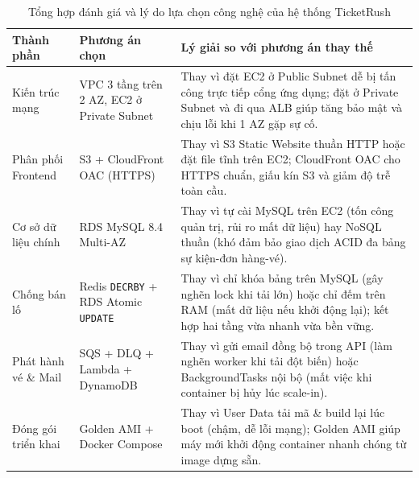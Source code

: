 \begin{table}[H]
  \centering
  \scriptsize
  \renewcommand{\arraystretch}{1.25}
  \begin{tabularx}{\textwidth}{>{\raggedright\arraybackslash}p{2.6cm} >{\raggedright\arraybackslash}p{3.1cm} >{\raggedright\arraybackslash}X}
    \toprule
    \textbf{Thành phần} & \textbf{Phương án chọn} & \textbf{Lý giải so với phương án thay thế} \\
    \midrule
    Kiến trúc mạng & VPC 3 tầng trên 2 AZ, EC2 ở Private Subnet & Thay vì đặt EC2 ở Public Subnet dễ bị tấn công trực tiếp cổng ứng dụng; đặt ở Private Subnet và đi qua ALB giúp tăng bảo mật và chịu lỗi khi 1 AZ gặp sự cố. \\
    \midrule
    Phân phối Frontend & S3 + CloudFront OAC (HTTPS) & Thay vì S3 Static Website thuần HTTP hoặc đặt file tĩnh trên EC2; CloudFront OAC cho HTTPS chuẩn, giấu kín S3 và giảm độ trễ toàn cầu. \\
    \midrule
    Cơ sở dữ liệu chính & RDS MySQL 8.4 Multi-AZ & Thay vì tự cài MySQL trên EC2 (tốn công quản trị, rủi ro mất dữ liệu) hay NoSQL thuần (khó đảm bảo giao dịch ACID đa bảng sự kiện-đơn hàng-vé). \\
    \midrule
    Chống bán lố & Redis \texttt{DECRBY} + RDS Atomic \texttt{UPDATE} & Thay vì chỉ khóa bảng trên MySQL (gây nghẽn lock khi tải lớn) hoặc chỉ đếm trên RAM (mất dữ liệu nếu khởi động lại); kết hợp hai tầng vừa nhanh vừa bền vững. \\
    \midrule
    Phát hành vé \& Mail & SQS + DLQ + Lambda + DynamoDB & Thay vì gửi email đồng bộ trong API (làm nghẽn worker khi tải đột biến) hoặc BackgroundTasks nội bộ (mất việc khi container bị hủy lúc scale-in). \\
    \midrule
    Đóng gói triển khai & Golden AMI + Docker Compose & Thay vì User Data tải mã \& build lại lúc boot (chậm, dễ lỗi mạng); Golden AMI giúp máy mới khởi động container nhanh chóng từ image dựng sẵn. \\
    \bottomrule
  \end{tabularx}
  \caption{Tổng hợp đánh giá và lý do lựa chọn công nghệ của hệ thống TicketRush}
  \label{tab:clo2-summary}
\end{table}


